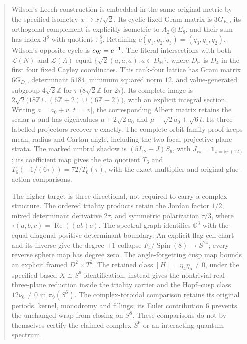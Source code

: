 \documentclass[11pt]{article}
\theoremstyle{definition}
\begin{document}
\begin{abstract}
Wilson's Leech construction \cite{esn:Wilson2009} is embedded in the
same original metric by the specified isometry $x\mapsto x/\sqrt2$.
Its cyclic fixed Gram matrix is $3G_{E_8}$, its orthogonal complement
is explicitly isometric to $A_2\otimes E_8$, and their sum has index
$3^8$ with quotient $\mathbb F_3^8$. Retaining
$c(q_1,q_2,q_3)=(q_3,q_1,q_2)$, Wilson's opposite cycle is
$c_{\rm W}=c^{-1}$. The literal intersections with both
$\mathcal L(N)$ and $\mathcal L(\Lambda)$ equal
$\{\sqrt2(a,a,a):a\in D_{\mathbb H}\}$, where $D_{\mathbb H}$
is $D_4$ in the first four fixed Cayley coordinates. This rank-four
lattice has Gram matrix $6G_{D_4}$, determinant $5184$, minimum squared
norm $12$, and value-generated subgroup $4\sqrt2\mathbb Z$ for $\tau$
($8\sqrt2\mathbb Z$ for $2\tau$). Its complete image is
$2\sqrt2\bigl(18\mathbb Z\cup(6\mathbb Z+2)\cup(6\mathbb Z-2)\bigr)$,
with an explicit integral section. Writing $a=a_0+v$, $t=|v|$,
the corresponding Albert matrix retains the scalar $\mu$ and has
eigenvalues $\mu+2\sqrt2a_0$ and
$\mu-\sqrt2a_0\pm\sqrt6t$. Its three labelled projectors recover
$v$ exactly. The complete orbit-family proof keeps mean, radius and
Cartan angle, including the two focal projective-plane strata.
The marked umbral shadow is $(5I_{12}+J)S_6$, with
$J_{rs}=\mathbf1_{s=5r\ (12)}$; its coefficient map gives the
eta quotient $T_6$ and $T_6(-1/(6\tau))=72/T_6(\tau)$,
with the exact multiplier and original glue-action comparisons.

The higher target is three-directional, not required to carry a
complex structure. The ordered triality products retain the Jordan
factor $1/2$, mixed determinant derivative $2\tau$, and symmetric
polarization $\tau/3$, where $\tau(a,b,c)=\operatorname{Re}((ab)c)$.
The spectral graph identifies $\mathbb O^3$ with the equal-diagonal
positive determinant boundary. An explicit flag-cell chart and its
inverse give the degree-$+1$ collapse
$F_4/\operatorname{Spin}(8)\to S^{24}$; every reverse sphere map has
degree zero. The angle-forgetting cusp map bounds an explicit framed
$D^2\times T^2$. The retained class $[H]=\eta_4\eta_5\ne0$, under
the specified based $X\cong S^6$ identification, instead gives the
nontrivial real three-plane reduction inside the triality carrier and
the Hopf--cusp class $12\nu_6\ne0$ in $\pi_9(S^6)$.
The complex-toroidal comparison retains its original periods, kernel,
monodromy and fillings; its Euler contribution $6$ prevents the unchanged
wrap from closing on $S^8$. These comparisons do not by themselves
certify the claimed complex $S^6$ or an interacting quantum spectrum.
\end{abstract}
\end{document}
